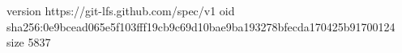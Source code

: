 version https://git-lfs.github.com/spec/v1
oid sha256:0e9bcead065e5f103fff19cb9c69d10bae9ba193278bfecda170425b91700124
size 5837
